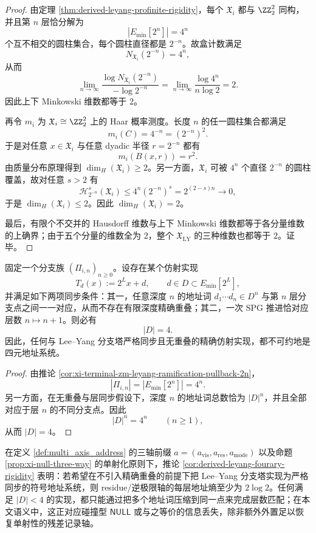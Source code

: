 \documentclass[../../../main.tex]{subfiles}
\begin{document}
\begin{proof}
由定理 \ref{thm:derived-leyang-profinite-rigidity}，每个 \(\mathfrak X_i\) 都与 \(\ZZ_2^2\) 同构，并且第 \(n\) 层恰分解为
\[
|E_{\min}[2^n]|=4^n
\]
个互不相交的圆柱集合，每个圆柱直径都是 \(2^{-n}\)。故盒计数满足
\[
N_{\mathfrak X_i}(2^{-n})=4^n,
\]
从而
\[
\lim_{n\to\infty}\frac{\log N_{\mathfrak X_i}(2^{-n})}{-\log 2^{-n}}
=
\lim_{n\to\infty}\frac{\log 4^n}{n\log 2}
=2.
\]
因此上下 Minkowski 维数都等于 \(2\)。

再令 \(m_i\) 为 \(\mathfrak X_i\cong \ZZ_2^2\) 上的 Haar 概率测度。长度 \(n\) 的任一圆柱集合都满足
\[
m_i(C)=4^{-n}=(2^{-n})^2.
\]
于是对任意 \(x\in \mathfrak X_i\) 与任意 dyadic 半径 \(r=2^{-n}\) 都有
\[
m_i(B(x,r))=r^2.
\]
由质量分布原理得到 \(\dim_H(\mathfrak X_i)\ge 2\)。另一方面，\(\mathfrak X_i\) 可被 \(4^n\) 个直径 \(2^{-n}\) 的圆柱覆盖，故对任意 \(s>2\) 有
\[
\mathcal H^s_{2^{-n}}(\mathfrak X_i)\le 4^n(2^{-n})^s=2^{(2-s)n}\to 0,
\]
于是 \(\dim_H(\mathfrak X_i)\le 2\)。因此 \(\dim_H(\mathfrak X_i)=2\)。

最后，有限个不交并的 Hausdorff 维数与上下 Minkowski 维数都等于各分量维数的上确界；由于五个分量的维数全为 \(2\)，整个 \(\mathfrak X_{\mathrm{LY}}\) 的三种维数也都等于 \(2\)。证毕。
\end{proof}

\begin{corollary}\label{cor:derived-leyang-fourary-rigidity}
固定一个分支族 \((\Pi_{i,n})_{n\ge 0}\)。设存在某个仿射实现
\[
T_d(x):=2^Lx+d,
\qquad
d\in D\subset E_{\min}[2^L],
\]
并满足如下两项同步条件：其一，任意深度 \(n\) 的地址词 \(d_1\cdots d_n\in D^n\) 与第 \(n\) 层分支点之间一一对应，从而不存在有限深度精确重叠；其二，一次 SPG 推进恰对应层数 \(n\mapsto n+1\)。则必有
\[
|D|=4.
\]
因此，任何与 Lee--Yang 分支塔严格同步且无重叠的精确仿射实现，都不可约地是四元地址系统。
\end{corollary}

\begin{proof}
由推论 \ref{cor:xi-terminal-zm-leyang-ramification-pullback-2n}，
\[
|\Pi_{i,n}|=|E_{\min}[2^n]|=4^n.
\]
另一方面，在无重叠与层同步假设下，深度 \(n\) 的地址词总数恰为 \(|D|^n\)，并且全部对应于层 \(n\) 的不同分支点。因此
\[
|D|^n=4^n
\qquad (n\ge 1),
\]
从而 \(|D|=4\)。
\end{proof}

\begin{remark}[三轴地址语义下的熵下界]\label{rem:derived-leyang-entropy-floor}
在定义 \ref{def:multi_axis_address} 的三轴前缀
\(
a=(a_{\mathrm{vis}},a_{\mathrm{res}},a_{\mathrm{mode}})
\)
以及命题 \ref{prop:xi-null-three-way} 的单射化原则下，推论 \ref{cor:derived-leyang-fourary-rigidity} 表明：若希望在不引入精确重叠的前提下把 Lee--Yang 分支塔实现为严格同步的符号地址系统，则 residue/逆极限轴的每层地址熵至少为 \(2\log 2\)。任何满足 \(|D|<4\) 的实现，都只能通过把多个地址词压缩到同一点来完成层数匹配；在本文语义中，这正对应碰撞型 \(\mathsf{NULL}\) 或与之等价的信息丢失，除非额外外置足以恢复单射性的残差记录轴。
\end{remark}
\end{document}
